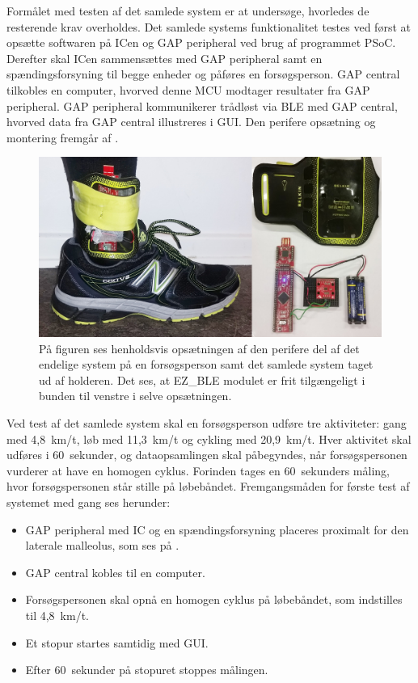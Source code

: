Formålet med testen af det samlede system er at undersøge, hvorledes de resterende krav overholdes. Det samlede systems funktionalitet testes ved først at opsætte softwaren på ICen og GAP peripheral ved brug af programmet PSoC. Derefter skal ICen sammensættes med GAP peripheral samt en spændingsforsyning til begge enheder og påføres en forsøgsperson. GAP central tilkobles en computer, hvorved denne MCU modtager resultater fra GAP peripheral. GAP peripheral kommunikerer trådløst via BLE med GAP central, hvorved data fra GAP central illustreres i GUI. Den perifere opsætning og montering fremgår af .
\begin{figure}[H]
	\centering
	\includegraphics[scale=0.143]{figures/cDesign/samlet_system_paafod4.jpg}
	\caption{På figuren ses henholdsvis opsætningen af den perifere del af det endelige system på en forsøgsperson samt det samlede system taget ud af holderen. Det ses, at EZ\_BLE modulet er frit tilgængeligt i bunden til venstre i selve opsætningen.}
	\label{fig:samlede_system_opstilling}
\end{figure}\vspace{-.25cm}
Ved test af det samlede system skal en forsøgsperson udføre tre aktiviteter: gang med 4,8~km/t, løb med 11,3~km/t og cykling med 20,9~km/t. Hver aktivitet skal udføres i 60~sekunder, og dataopsamlingen skal påbegyndes, når forsøgspersonen vurderer at have en homogen cyklus. Forinden tages en 60~sekunders måling, hvor forsøgspersonen står stille på løbebåndet. Fremgangsmåden for første test af systemet med gang ses herunder: 
\begin{itemize}
\item GAP peripheral med IC og en spændingsforsyning placeres proximalt for den laterale malleolus, som ses på .
\item GAP central kobles til en computer.
\item Forsøgspersonen skal opnå en homogen cyklus på løbebåndet, som indstilles til 4,8~km/t. 
\item Et stopur startes samtidig med GUI.
\item Efter 60~sekunder på stopuret stoppes målingen.
\end{itemize}
